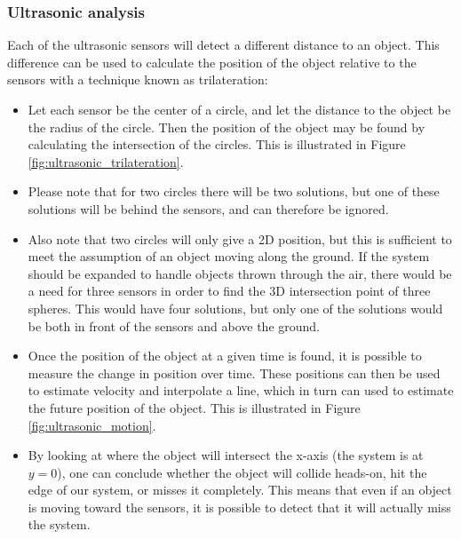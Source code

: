 \subsubsection{Ultrasonic analysis}

Each of the ultrasonic sensors will detect a different distance to an object. This difference can be used to calculate the position of the object relative to the sensors with a technique known as trilateration:

\begin{itemize}
    \item Let each sensor be the center of a circle, and let the distance to the object be the radius of the circle. Then the position of the object may be found by calculating the intersection of the circles. This is illustrated in Figure \ref{fig:ultrasonic_trilateration}.
    \item Please note that for two circles there will be two solutions, but one of these solutions will be behind the sensors, and can therefore be ignored.
    \item Also note that two circles will only give a 2D position, but this is sufficient to meet the assumption of an object moving along the ground. If the system should be expanded to handle objects thrown through the air, there would be a need for three sensors in order to find the 3D intersection point of three spheres. This would have four solutions, but only one of the solutions would be both in front of the sensors and above the ground.
    \item Once the position of the object at a given time is found, it is possible to measure the change in position over time. These positions can then be used to estimate velocity and interpolate a line, which in turn can used to estimate the future position of the object. This is illustrated in Figure \ref{fig:ultrasonic_motion}.
    \item By looking at where the object will intersect the x-axis (the system is at $y = 0$), one can conclude whether the object will collide heads-on, hit the edge of our system, or misses it completely. This means that even if an object is moving toward the sensors, it is possible to detect that it will actually miss the system.
\end{itemize}

